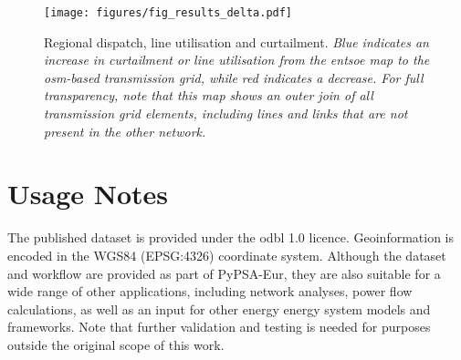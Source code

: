 \documentclass[fleqn,10pt]{wlscirep}
\begin{document}
\newpage
\begin{figure}[!htbp]
    \centering
    \texttt{[image: figures/fig\_results\_delta.pdf]}
    \caption{Regional dispatch, line utilisation and curtailment. \textit{Blue indicates an increase in curtailment or line utilisation from the \acrshort{entsoe} map to the \gls{osm}-based transmission grid, while red indicates a decrease. For full transparency, note that this map shows an outer join of all transmission grid elements, including lines and links that are not present in the other network.}}
    \label{fig:results_delta}
\end{figure}

\newpage

\section*{Usage Notes}


The published dataset is provided under the \gls{odbl} 1.0 licence. Geoinformation is encoded in the WGS84 (EPSG:4326) coordinate system. Although the dataset and workflow are provided as part of PyPSA-Eur, they are also suitable for a wide range of other applications, including network analyses, power flow calculations, as well as an input for other energy energy system models and frameworks. Note that further validation and testing is needed for purposes outside the original scope of this work. 
\end{document}
